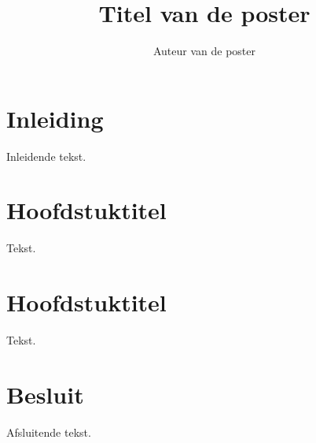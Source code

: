 \documentclass{kulakposter}
\title{Titel van de poster} %
\author{Auteur van de poster} %
\institute{Onderzoeksgroep} %
\begin{document}
\maketitle

\section*{Inleiding}
\begin{multicols}{2}\setlength{\columnseprule}{0pt}
Inleidende tekst.
\end{multicols}

\begin{multicols}{2}
\section{Hoofdstuktitel}
Tekst.

\columnbreak
\section{Hoofdstuktitel}
Tekst.
\end{multicols}

\section*{Besluit}
\begin{multicols}{2}\setlength{\columnseprule}{0pt}
Afsluitende tekst.
\end{multicols}
\end{document}
